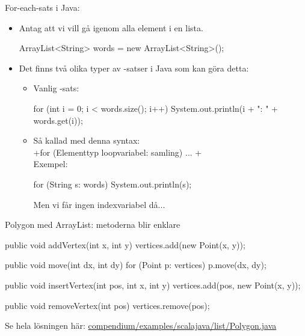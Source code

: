 \begin{Slide}{For-each-sats i Java:}\SlideFontSmall
\begin{itemize}
\item  Antag att vi vill gå igenom alla element i en lista. 
\begin{Code}[numberstyle=,language=Java]
        ArrayList<String> words = new ArrayList<String>();
\end{Code}
\item Det finns två olika typer av -satser i Java som kan göra detta:
\begin{itemize}\footnotesize
\item[]  Vanlig -sats:
\begin{Code}[numberstyle=,language=Java]
for (int i = 0; i < words.size(); i++) {
    System.out.println(i + ": " + words.get(i));
}
\end{Code}

\item[]  Så kallad  med denna syntax:\\
\jcode+for (Elementtyp loopvariabel: samling) { ... }+ \\
\vspace{1em}Exempel:
\begin{Code}[numberstyle=,language=Java]
for (String s: words) {
    System.out.println(s);
}
\end{Code}
Men vi får ingen indexvariabel då...
\end{itemize}
\end{itemize}
\end{Slide}


\begin{Slide}{Polygon med ArrayList: metoderna blir enklare}
\begin{Code}[numberstyle=,language=Java]
    public void addVertex(int x, int y) {  
        vertices.add(new Point(x, y));
    }
    
    public void move(int dx, int dy) {
        for (Point p: vertices){
            p.move(dx, dy);
        }
    }
    
    public void insertVertex(int pos, int x, int y) {
        vertices.add(pos, new Point(x, y));
    }
    
    public void removeVertex(int pos) {
        vertices.remove(pos);
    }
\end{Code}

Se hela lösningen här:
\href{https://github.com/lunduniversity/introprog/tree/master/compendium/examples/scalajava/list/Polygon.java}{compendium/examples/scalajava/list/Polygon.java}
\end{Slide}


